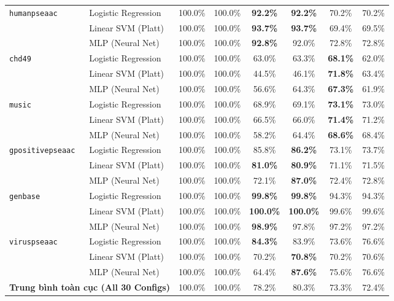 \documentclass[11pt,a4paper]{article}
\begin{document}
\begin{table}[H]
{\begin{tabular}{llcccccc}
\midrule
\multirow{3}{*}{\texttt{humanpseaac}} & Logistic Regression & 100.0\% & 100.0\% & \textbf{92.2\%} & \textbf{92.2\%} & 70.2\% & 70.2\% \\
 & Linear SVM (Platt) & 100.0\% & 100.0\% & \textbf{93.7\%} & \textbf{93.7\%} & 69.4\% & 69.5\% \\
 & MLP (Neural Net) & 100.0\% & 100.0\% & \textbf{92.8\%} & 92.0\% & 72.8\% & 72.8\% \\
\midrule
\multirow{3}{*}{\texttt{chd49}} & Logistic Regression & 100.0\% & 100.0\% & 63.0\% & 63.3\% & \textbf{68.1\%} & 62.0\% \\
 & Linear SVM (Platt) & 100.0\% & 100.0\% & 44.5\% & 46.1\% & \textbf{71.8\%} & 63.4\% \\
 & MLP (Neural Net) & 100.0\% & 100.0\% & 56.6\% & 64.3\% & \textbf{67.3\%} & 61.9\% \\
\midrule
\multirow{3}{*}{\texttt{music}} & Logistic Regression & 100.0\% & 100.0\% & 68.9\% & 69.1\% & \textbf{73.1\%} & 73.0\% \\
 & Linear SVM (Platt) & 100.0\% & 100.0\% & 66.5\% & 66.0\% & \textbf{71.4\%} & 71.2\% \\
 & MLP (Neural Net) & 100.0\% & 100.0\% & 58.2\% & 64.4\% & \textbf{68.6\%} & 68.4\% \\
\midrule
\multirow{3}{*}{\texttt{gpositivepseaac}} & Logistic Regression & 100.0\% & 100.0\% & 85.8\% & \textbf{86.2\%} & 73.1\% & 73.7\% \\
 & Linear SVM (Platt) & 100.0\% & 100.0\% & \textbf{81.0\%} & \textbf{80.9\%} & 71.1\% & 71.5\% \\
 & MLP (Neural Net) & 100.0\% & 100.0\% & 72.1\% & \textbf{87.0\%} & 72.4\% & 72.8\% \\
\midrule
\multirow{3}{*}{\texttt{genbase}} & Logistic Regression & 100.0\% & 100.0\% & \textbf{99.8\%} & \textbf{99.8\%} & 94.3\% & 94.3\% \\
 & Linear SVM (Platt) & 100.0\% & 100.0\% & \textbf{100.0\%} & \textbf{100.0\%} & 99.6\% & 99.6\% \\
 & MLP (Neural Net) & 100.0\% & 100.0\% & \textbf{98.9\%} & 97.8\% & 97.2\% & 97.2\% \\
\midrule
\multirow{3}{*}{\texttt{viruspseaac}} & Logistic Regression & 100.0\% & 100.0\% & \textbf{84.3\%} & 83.9\% & 73.6\% & 76.6\% \\
 & Linear SVM (Platt) & 100.0\% & 100.0\% & 70.2\% & \textbf{70.8\%} & 70.2\% & 70.6\% \\
 & MLP (Neural Net) & 100.0\% & 100.0\% & 64.4\% & \textbf{87.6\%} & 75.6\% & 76.6\% \\
\midrule
\multicolumn{2}{l}{\textbf{Trung bình toàn cục (All 30 Configs)}} & 100.0\% & 100.0\% & 78.2\% & 80.3\% & 73.3\% & 72.4\% \\
\bottomrule
\end{tabular}%
}
\end{table}
\end{document}
